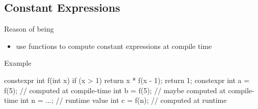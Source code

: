 \subsection[cstexpr]{Constant Expressions}

\begin{frame}[fragile]
  \begin{block}{Reason of being}
    \begin{itemize}
    \item use functions to compute constant expressions at compile time
    \end{itemize}
  \end{block}
  \pause
  \begin{exampleblock}{Example}
    \begin{cppcode*}{}
      constexpr int f(int x) {
        if (x > 1) return x * f(x - 1);
        return 1;
      }
      constexpr int a = f(5); // computed at compile-time
      int b = f(5); // maybe computed at compile-time
      int n = ...;  // runtime value
      int c = f(n); // computed at runtime
    \end{cppcode*}
  \end{exampleblock}
\end{frame}


